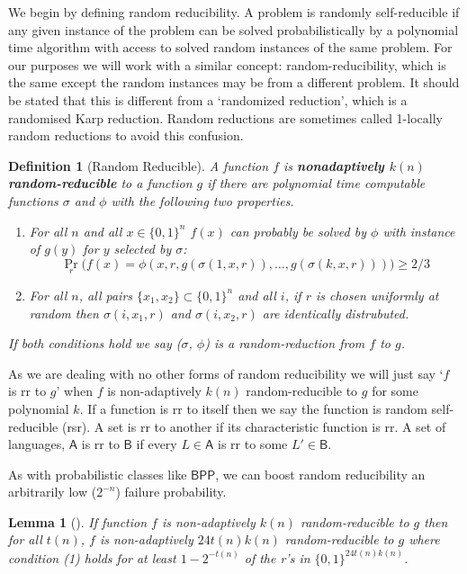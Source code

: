 \documentclass{article}
\newtheorem{definition}[theorem]{Definition}
\newtheorem{lemma}[theorem]{Lemma}
\begin{document}
We begin by defining random reducibility. A problem is randomly self-reducible if any given instance of the problem can be solved probabilistically by a polynomial time algorithm with access to solved random instances of the same problem.  
For our purposes we will work with a similar concept: random-reducibility, which is the same except the random instances may be from a different problem. It should be stated that this is different from a `randomized reduction', which is a randomised Karp reduction. Random reductions are sometimes called 1-locally random reductions to avoid this confusion.

\begin{definition}[Random Reducible]\label{def: random reducible}
    A function $f$ is \textbf{nonadaptively $k(n)$ random-reducible} to a function $g$ if there are polynomial time computable functions $\sigma$ and $\phi$ with the following two properties.
    \begin{enumerate}[label={(\arabic*)}]
        \item For all $n$ and all $x \in \{0,1\}^n$ $f(x)$ can probably be solved by $\phi$ with instance of $g(y)$ for $y$ selected by $\sigma$:
            \[
            \Pr_{r}\big(
            f(x)=\phi(x,r,g(\sigma(1,x,r)),\ldots, g(\sigma(k, x, r)))
            \big)\geq2/3
            \]
        \item For all $n$, all pairs $\{x_1,x_2\}\subset \{0,1\}^n$ and all $i$, if $r$ is chosen uniformly at random then $\sigma(i,x_1,r)$ and $\sigma(i,x_2,r)$ are identically distrubuted.
    \end{enumerate}
    If both conditions hold we say ($\sigma$, $\phi$) is a random-reduction from $f$ to $g$.
\end{definition}

As we are dealing with no other forms of random reducibility we will just say `$f$ is rr to $g$' when $f$ is non-adaptively $k(n)$ random-reducible to $g$ for some polynomial $k$. If a function is rr to itself then we say the function is random self-reducible (rsr). A set is rr to another if its characteristic function is rr. A set of languages, $\mathsf{A}$ is rr to $\mathsf{B}$ if every $L\in \mathsf{A}$ is rr to some $L'\in\mathsf{B}$.

As with probabilistic classes like $\mathsf{BPP}$, we can boost random reducibility an arbitrarily low ($2^{-n}$) failure probability.

\begin{lemma}[\cite{feigenbaum1990random}]\label{lma: boost rr}
    If function $f$ is non-adaptively $k(n)$ random-reducible to $g$ then for all $t(n)$, $f$ is non-adaptively $24t(n)k(n)$ random-reducible to $g$ where condition (1) holds for at least $1-2^{-t(n)}$ of the r's in $\{0,1\}^{24t(n)k(n)}$.
\end{lemma}
\end{document}
